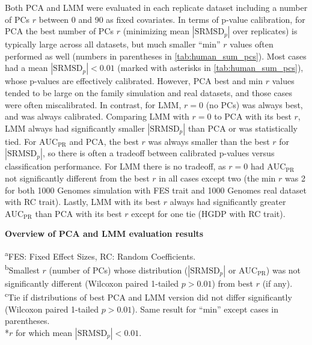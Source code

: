 \documentclass[11pt]{article}
\newcommand{\rmsd}{\text{SRMSD}_p}
\newcommand{\auc}{\text{AUC}_\text{PR}}
\begin{document}
Both PCA and LMM were evaluated in each replicate dataset including a number of PCs $r$ between 0 and 90 as fixed covariates.
In terms of p-value calibration, for PCA the best number of PCs $r$ (minimizing mean $|\rmsd|$ over replicates) is typically large across all datasets, but much smaller ``min'' $r$ values often performed as well (numbers in parentheses in \cref{tab:human_sum_pcs}).
Most cases had a mean $|\rmsd| < 0.01$ (marked with asterisks in \cref{tab:human_sum_pcs}), whose p-values are effectively calibrated.
However, PCA best and min $r$ values tended to be large on the family simulation and real datasets, and those cases were often miscalibrated.
In contrast, for LMM, $r=0$ (no PCs) was always best, and was always calibrated.
Comparing LMM with $r=0$ to PCA with its best $r$, LMM always had significantly smaller $|\rmsd|$ than PCA or was statistically tied.
%
For $\auc$ and PCA, the best $r$ was always smaller than the best $r$ for $|\rmsd|$, so there is often a tradeoff between calibrated p-values versus classification performance.
For LMM there is no tradeoff, as $r=0$ had $\auc$ not significantly different from the best $r$ in all cases except two (the min $r$ was 2 for both 1000 Genomes simulation with FES trait and 1000 Genomes real dataset with RC trait).
Lastly, LMM with its best $r$ always had significantly greater $\auc$ than PCA with its best $r$ except for one tie (HGDP with RC trait).

\begin{table}[hb!]
  \centering
  \caption{
    \textbf{Overview of PCA and LMM evaluation results}
  }
  \label{tab:human_sum_pcs}
  \csvreader[
  tabular = lc|ccc|ccc,
  separator = tab,
  table head = 
  \toprule & & \multicolumn{3}{c|}{$|\rmsd|$} & \multicolumn{3}{c}{$\auc$} \\
  \midrule & & \multicolumn{2}{c}{Best (min\textsuperscript{b}) PCs} & & \multicolumn{2}{c}{Best (min\textsuperscript{b}) PCs} & \\
  Dataset & {Trait model\textsuperscript{a}} & PCA & LMM & {Best\textsuperscript{c}} & PCA & LMM & {Best\textsuperscript{c}} \\\midrule,
  late after last line = \\\bottomrule
  ]{../data/stats.txt}{}{\csvlinetotablerow}
  \begin{flushleft}
    \textsuperscript{a}FES: Fixed Effect Sizes, RC: Random Coefficients.\\
    \textsuperscript{b}Smallest $r$ (number of PCs) whose distribution ($|\rmsd|$ or $\auc$) was not significantly different (Wilcoxon paired 1-tailed $p > 0.01$) from best $r$ (if any).\\
    \textsuperscript{c}Tie if distributions of best PCA and LMM version did not differ significantly (Wilcoxon paired 1-tailed $p > 0.01$).
    Same result for ``min'' except cases in parentheses.\\
    *$r$ for which mean $|\rmsd| < 0.01$.
  \end{flushleft}
\end{table}
\end{document}
